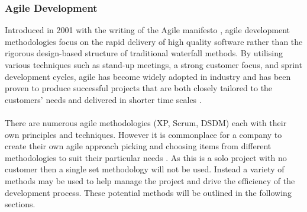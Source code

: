 	\subsubsection{Agile Development}
		Introduced in 2001 with the writing of the Agile manifesto \citep{beck2001manifesto}, agile development methodologies focus on the rapid delivery of high quality software rather than the rigorous design-based structure of traditional waterfall methods. By utilising various techniques such as stand-up meetings, a strong customer focus, and sprint development cycles, agile has become widely adopted in industry and has been proven to produce successful projects that are both closely tailored to the customers’ needs and delivered in shorter time scales \citep{state_of_agile_2015}.
		\\\\
		There are numerous agile methodologies (XP, Scrum, DSDM) each with their own principles and techniques. However it is commonplace for a company to create their own agile approach picking and choosing items from different methodologies to suit their particular needs \citep{aydin2004agile}. As this is a solo project with no customer then a single set methodology will not be used. Instead a variety of methods may be used to help manage the project and drive the efficiency of the development process. These potential methods will be outlined in the following sections.
